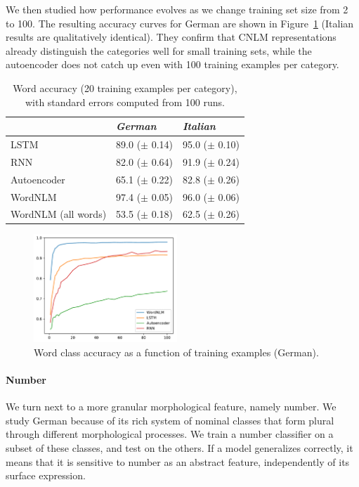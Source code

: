 We then studied how performance evolves as we change training set size from 2 to 100. The resulting accuracy curves for German are shown in Figure~\ref{fig:pos-induction} (Italian results are qualitatively identical). They confirm that CNLM representations already distinguish the categories well for small training sets, while the autoencoder does not catch up even with 100 training examples per category.

\begin{table}[t]
  \begin{center}
    \begin{tabular}{l|l|l}
   &\emph{German}&\emph{Italian}\\
      \hline
	    LSTM & 89.0 ($\pm$ 0.14) & 95.0 ($\pm$ 0.10) \\
	    RNN & 82.0 ($\pm$ 0.64) & 91.9 ($\pm$ 0.24) \\
	    Autoencoder & 65.1 ($\pm$ 0.22) & 82.8 ($\pm$ 0.26) \\
	    WordNLM & 97.4 ($\pm$ 0.05) & 96.0 ($\pm$ 0.06) \\
	    WordNLM (all words) & 53.5 ($\pm$ 0.18)  & 62.5 ($\pm$ 0.26) \\
    \end{tabular}
  \end{center}
  \caption{\label{tab:pos-results} Word  accuracy (20 training examples per category), with standard errors computed from 100 runs.}
\end{table}


\begin{figure}
\includegraphics[width=0.48\textwidth]{figures/german_pos_nouns_verbs.pdf}
	\caption{Word class accuracy as a function of training examples (German). }\label{fig:pos-induction}
\end{figure}





\paragraph{Number}
We turn next to a more granular morphological feature, namely
number. We study German because of its rich system of nominal classes
that form plural through different morphological processes. We train a
number classifier on a subset of these classes, and test on the
others. If a model generalizes correctly, it means that it is
sensitive to number as an abstract feature, independently of its
surface expression.

